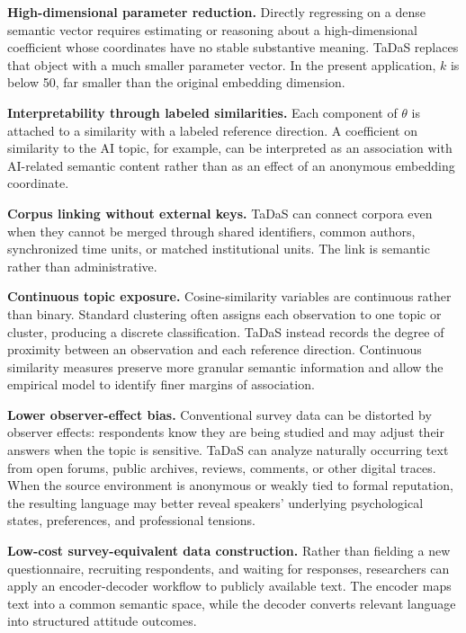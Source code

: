 \documentclass[11pt]{article}
\begin{document}
\textbf{High-dimensional parameter reduction.} Directly regressing on a dense semantic vector requires estimating or reasoning about a high-dimensional coefficient whose coordinates have no stable substantive meaning. TaDaS replaces that object with a much smaller parameter vector. In the present application, $k$ is below 50, far smaller than the original embedding dimension.

\textbf{Interpretability through labeled similarities.} Each component of $\theta$ is attached to a similarity with a labeled reference direction. A coefficient on similarity to the AI topic, for example, can be interpreted as an association with AI-related semantic content rather than as an effect of an anonymous embedding coordinate.

\textbf{Corpus linking without external keys.} TaDaS can connect corpora even when they cannot be merged through shared identifiers, common authors, synchronized time units, or matched institutional units. The link is semantic rather than administrative.

\textbf{Continuous topic exposure.} Cosine-similarity variables are continuous rather than binary. Standard clustering often assigns each observation to one topic or cluster, producing a discrete classification. TaDaS instead records the degree of proximity between an observation and each reference direction. Continuous similarity measures preserve more granular semantic information and allow the empirical model to identify finer margins of association.

\textbf{Lower observer-effect bias.} Conventional survey data can be distorted by observer effects: respondents know they are being studied and may adjust their answers when the topic is sensitive. TaDaS can analyze naturally occurring text from open forums, public archives, reviews, comments, or other digital traces. When the source environment is anonymous or weakly tied to formal reputation, the resulting language may better reveal speakers' underlying psychological states, preferences, and professional tensions.

\textbf{Low-cost survey-equivalent data construction.} Rather than fielding a new questionnaire, recruiting respondents, and waiting for responses, researchers can apply an encoder-decoder workflow to publicly available text. The encoder maps text into a common semantic space, while the decoder converts relevant language into structured attitude outcomes.
\end{document}
